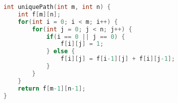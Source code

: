 \begin{table}[H]
	\centering
	\caption{边界情况}
\end{table}


\begin{lstlisting}[language=C]
int uniquePath(int m, int n) {
    int f[m][n];
    for(int i = 0; i < m; i++) {
        for(int j = 0; j < n; j++) {
            if(i == 0 || j == 0) {
                f[i][j] = 1;
            } else {
                f[i][j] = f[i-1][j] + f[i][j-1];
            }
        }
    }
    return f[m-1][n-1];
}
\end{lstlisting}

\newpage

